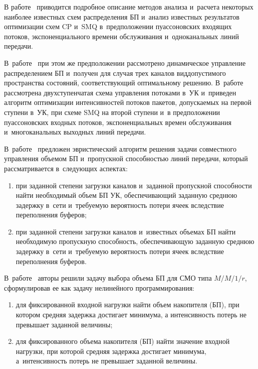 \begin{multicols}{2}
  В работе~\cite{5-ag} приводится подробное описание методов анализа 
и~расчета некоторых наиболее известных схем распределения БП и~анализ 
известных результатов оптимизации схем CP и~SMQ в~предположении 
пуассоновских входящих потоков, экспоненциального времени обслуживания 
и~одноканальных линий передачи. 

В~работе~\cite{7-ag} при этом же 
предположении рас\-смот\-ре\-но динамическое управ\-ле\-ние рас\-пре\-де\-ле\-нием БП 
и~получен для случая трех каналов вид\linebreak допустимого пространства состояний, 
соответствующий оптимальному решению. В~работе~\cite{8-ag} рассмотрена 
двухступенчатая схема управления потоками в~УК и~приведен алгоритм 
оптимизации интенсивностей потоков пакетов, допускаемых на первой ступени 
в~УК, при схеме SMQ на второй ступени и~в предположении пуассоновских 
входных потоков, экспоненциальных времен обслуживания и~многоканальных 
выходных линий передачи. 

В~работе~\cite{9-ag} предложен эвристический 
алгоритм решения задачи совместного управления объемом БП
и~пропускной способностью линий передачи, который рассматривается 
в~следующих аспектах: 
\begin{enumerate}[(1)]
\item при заданной степени загрузки каналов и~заданной 
пропускной способности найти необходимый объем БП УК, 
обеспечивающий заданную среднюю задержку в~сети 
и~требуемую вероятность потери ячеек вследствие переполнения буферов; 
\item при заданной степени загрузки каналов и~известных объемах 
БП найти необходимую пропускную способность, обеспечивающую 
заданную среднюю задержку в~сети и~требуемую вероятность потери ячеек 
вследствие переполнения буферов.
\end{enumerate}

 В~работе~\cite{10-ag} авторы решили 
задачу выбора объема БП для СМО типа $M/M/1/r$, сформулировав ее как 
задачу нелинейного программирования:
\begin{enumerate}[(1)]
\item для фиксированной входной 
нагрузки найти объем накопителя (БП), при котором средняя задержка 
достигает минимума, а интенсивность потерь не превышает заданной 
величины; 
\item для фиксированного объема накопителя (БП) найти значение 
входной нагрузки, при которой средняя задержка достигает минимума, 
а~интенсивность потерь не превышает заданной величины.
\end{enumerate}


\end{multicols}
